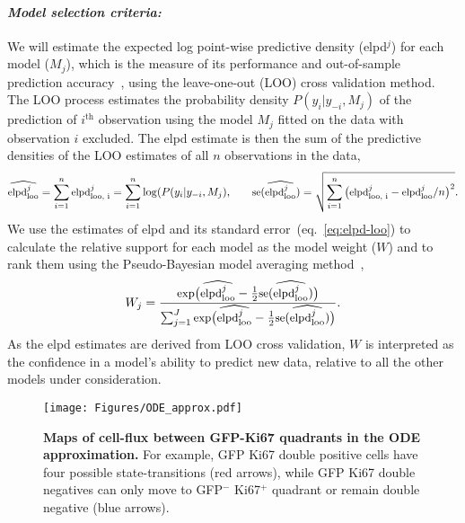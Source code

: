 \documentclass[11pt]{article}
\newcommand{\para}[1]{\vspace*{-4.5mm}\paragraph{#1}}
\begin{document}
\para{\textit{Model selection criteria:}}
We will estimate the expected log point-wise predictive density (elpd$^{j}$) for each model ($M_{j}$), which is the measure of its performance and out-of-sample prediction accuracy~\citep{Vehtari:2016}, using the leave-one-out (LOO) cross validation method. 
The LOO process estimates the probability density $P(y_i | y_{-i}, M_j)$ of the prediction of $i^\text{th}$ observation using the model $M_j$ fitted on the data with observation $i$ excluded.
The elpd estimate is then the sum of the predictive densities of the LOO estimates of all $n$ observations in the data,
\begin{equation} 
\small
\widehat{\text{elpd}^j_\text{loo}} = \sum_{i=1}^n  \text{elpd}^j_\text{loo, i}  = \sum_{i=1}^n \log(P(y_i | y_{-i}, M_j), \qquad \text{se}(\widehat{\text{elpd}^j_\text{loo}})  = \sqrt{\sum_{i=1}^n  \big(\text{elpd}^j_\text{loo, i} - \text{elpd}^j_\text{loo}/n \big)^2 }.
\label{eq:elpd-loo}
\end{equation}
We use the estimates of {elpd} and its standard error~(eq.~\ref{eq:elpd-loo}) to calculate the relative support for each model as the model weight ($W$) and  to rank them using the Pseudo-Bayesian model averaging method~\citep{Yao:2018},
\begin{equation} \small
W_j = \frac{\text{exp}\big(\widehat{\text{elpd}^j_\text{loo}} - \frac{1}{2}\text{se}(\widehat{\text{elpd}^j_\text{loo}})\big)}{\sum_{j=1}^J \text{exp}\big(\widehat{\text{elpd}^j_\text{loo}} - \frac{1}{2}\text{se}(\widehat{\text{elpd}^j_\text{loo}})\big)}.
\label{eq:model-weights}
\end{equation} 
As the {elpd} estimates are derived from LOO cross validation, $W$ is interpreted as the confidence in a model's ability to predict new data, relative to all the other models under consideration.

\begin{wrapfigure}{r}{0.24\textwidth}
\centering
\vspace*{-4mm}
\texttt{[image: Figures/ODE\_approx.pdf]}
\vspace*{-7mm}
\caption{\textbf{Maps of cell-flux between GFP-Ki67 quadrants in the ODE approximation.} 
For example, GFP Ki67 double positive cells have four possible state-transitions (red arrows), while GFP Ki67 double negatives can only move to GFP$^-$ Ki67$^+$ quadrant or remain double negative (blue arrows).}
\vspace*{-6mm}
\label{fig:ode_approx}
\end{wrapfigure}
\end{document}
